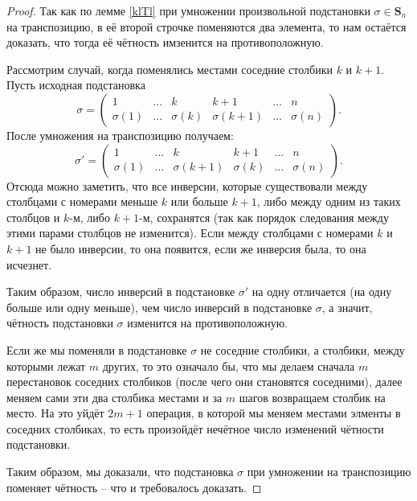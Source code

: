 \documentclass{article}
\begin{document}
\begin{proof}
    Так как по лемме \ref{klTl} при умножении произвольной подстановки $\sigma \in \mathbf{S}_n$ на транспозицию, в её второй строчке поменяются два элемента, то нам остаётся доказать, что тогда её чётность имзенится на противоположную.

    Рассмотрим случай, когда поменялись местами соседние столбики $k$ и $k + 1$. Пусть исходная подстановка
    \[
        \sigma = 
        \begin{pmatrix}
            1 & \dots & k & k + 1 & \dots & n \\
            \sigma(1) & \dots & \sigma(k) & \sigma(k + 1) & \dots & \sigma(n)
        \end{pmatrix}.
    \] После умножения на транспозицию получаем:
    \[
        \sigma' = 
        \begin{pmatrix}
            1 & \dots & k & k + 1 & \dots & n \\
            \sigma(1) & \dots & \sigma(k + 1) & \sigma(k) & \dots & \sigma(n)
        \end{pmatrix}.
    \]
    Отсюда можно заметить, что все инверсии, которые существовали между столбцами с номерами меньше $k$ или больше $k + 1$, либо между одним из таких столбцов и $k$-м, либо $k + 1$-м, сохранятся (так как порядок следования между этими парами столбцов не изменится). Если между столбцами с номерами $k$ и $k + 1$ не было инверсии, то она появится, если же инверсия была, то она исчезнет.

    Таким образом, число инверсий в подстановке $\sigma'$ на одну отличается (на одну больше или одну меньше), чем число инверсий в подстановке $\sigma$, а значит, чётность подстановки $\sigma$ изменится на противоположную.

    Если же мы поменяли в подстановке $\sigma$ не соседние столбики, а столбики, между которыми лежат $m$ других, то это означало бы, что мы делаем сначала $m$ перестановок соседних столбиков (после чего они становятся соседними), далее меняем сами эти два столбика местами и за $m$ шагов возвращаем столбик на место. На это уйдёт $ 2m + 1 $ операция, в которой мы меняем местами элменты в соседних столбиках, то есть произойдёт нечётное число изменений чётности подстановки.

    Таким образом, мы доказали, что подстановка $\sigma$ при умножении на транспозицию поменяет чётность -- что и требовалось доказать.
\end{proof}
\end{document}
